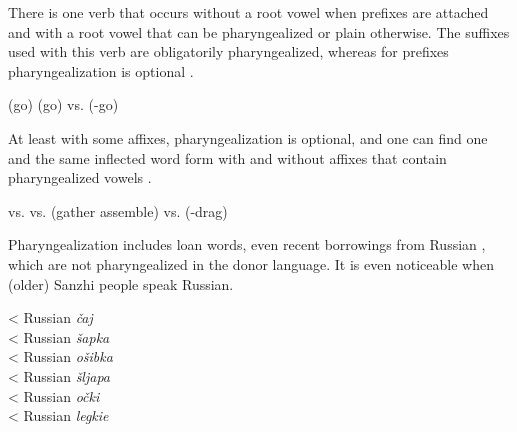 There is one verb  that occurs without a root vowel when prefixes are attached and with a root vowel that can be pharyngealized or plain otherwise. The suffixes used with this verb are obligatorily pharyngealized, whereas for prefixes pharyngealization is optional .
%
\begin{exe}
	\ex	\label{ex:go pharyngealization phon}
	\begin{xlist}
		\ex	{}  (go)
		\ex	{}  (go)
		\ex	{} vs.   (-go)
	\end{xlist}
\end{exe}

At least with some affixes, pharyngealization is optional, and one can find one and the same inflected word form with and without affixes that contain pharyngealized vowels .
%
\begin{exe}
	\ex	\label{ex:optional pharyngealization phon}
	\begin{xlist}
	\TabPositions{13em}
		\ex	{} vs.  		\tab \sqt{wet} 
		\ex	{} vs. 	\tab {} (gather assemble\tsc{-subj})
		\ex	{} vs.  		\tab {} (-drag\tsc{.pfv-imp.pl})
	\end{xlist}
\end{exe}




Pharyngealization includes loan words, even recent borrowings from Russian , which are not pharyngealized in the donor language. It is even noticeable when (older) Sanzhi people speak Russian.
%
\begin{exe}
	\ex	\label{ex:loan pharyngealization phon}
	\TabPositions{12em}
		 	\tab 	< Russian \textit{čaj}	 \\
		 	\tab 	< Russian 	\textit{šapka} \\
		 	\tab 	< Russian \textit{ošibka}	 \\	
		  \tab 	< Russian	\textit{šljapa} \\
		  \tab 	< Russian	\textit{očki} \\
		  \tab 	< Russian	\textit{legkie} 
\end{exe}


